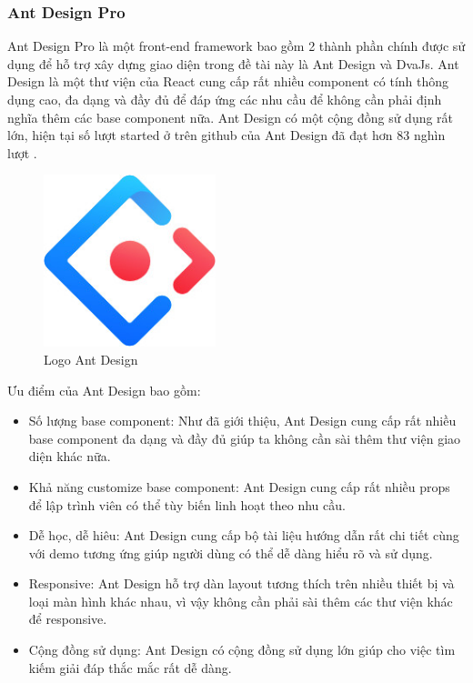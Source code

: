        \subsubsection{Ant Design Pro}
            \hspace*{0.5cm} Ant Design Pro là một front-end framework bao gồm 2 thành phần chính được sử dụng để hỗ trợ xây dựng giao diện trong đề tài này là Ant Design và DvaJs.
            \hspace*{0.5cm} Ant Design là một thư viện của React cung cấp rất nhiều component có tính thông dụng cao, đa dạng và đầy đủ để đáp ứng các nhu cầu để không cần phải định nghĩa thêm các base component nữa. Ant Design có một cộng đồng sử dụng rất lớn, hiện tại số lượt started ở trên github của Ant Design đã đạt hơn 83 nghìn lượt \cite{technologyAntdStar}.
            
            \begin{figure}[!htp]
                \begin{center}
                \includegraphics[width=5cm]{img/Technology/antd.jpg}
                \end{center}
                \caption{Logo Ant Design \cite{technologyAntd}}
            \end{figure}

            \hspace*{0.5cm} Ưu điểm của Ant Design bao gồm:
            \begin{itemize}
                \item Số lượng base component: Như đã giới thiệu, Ant Design cung cấp rất nhiều base component đa dạng và đầy đủ giúp ta không cần sài thêm thư viện giao diện khác nữa.
                \item Khả năng customize base component: Ant Design cung cấp rất nhiều props để lập trình viên có thể tùy biến linh hoạt theo nhu cầu.
                \item Dễ học, dễ hiêu: Ant Design cung cấp bộ tài liệu hướng dẫn rất chi tiết cùng với demo tương ứng giúp người dùng có thể dễ dàng hiểu rõ và sử dụng.
                \item Responsive: Ant Design hỗ trợ dàn layout tương thích trên nhiều thiết bị và loại màn hình khác nhau, vì vậy không cần phải sài thêm các thư viện khác để responsive.
                \item Cộng đồng sử dụng: Ant Design có cộng đồng sử dụng lớn giúp cho việc tìm kiếm giải đáp thắc mắc rất dễ dàng.
            \end{itemize}

